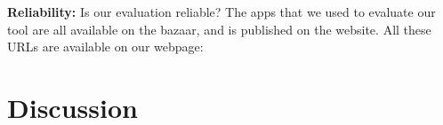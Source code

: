 \documentclass[article]{sigplanconf}
\begin{document}
\textbf{Reliability:} Is our evaluation reliable? The apps that we used to evaluate our tool are all available on the \TD bazaar, and \tool is published on the \TD website. All these URLs are available on our webpage: \\


\section{Discussion}
\label{sec:discussion}

%
%
\end{document}
